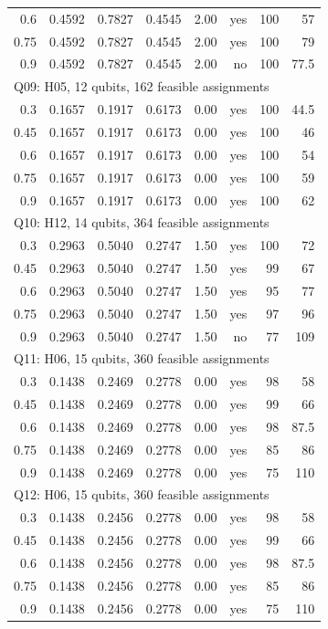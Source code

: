 \begin{longtable}{rrrrlrrr}
0.6 & 0.4592 & 0.7827 & 0.4545 & 2.00 & yes & 100 & 57 \\
0.75 & 0.4592 & 0.7827 & 0.4545 & 2.00 & yes & 100 & 79 \\
0.9 & 0.4592 & 0.7827 & 0.4545 & 2.00 & no & 100 & 77.5 \\
\multicolumn{8}{l}{Q09: H05, 12 qubits, 162 feasible assignments} \\
0.3 & 0.1657 & 0.1917 & 0.6173 & 0.00 & yes & 100 & 44.5 \\
0.45 & 0.1657 & 0.1917 & 0.6173 & 0.00 & yes & 100 & 46 \\
0.6 & 0.1657 & 0.1917 & 0.6173 & 0.00 & yes & 100 & 54 \\
0.75 & 0.1657 & 0.1917 & 0.6173 & 0.00 & yes & 100 & 59 \\
0.9 & 0.1657 & 0.1917 & 0.6173 & 0.00 & yes & 100 & 62 \\
\multicolumn{8}{l}{Q10: H12, 14 qubits, 364 feasible assignments} \\
0.3 & 0.2963 & 0.5040 & 0.2747 & 1.50 & yes & 100 & 72 \\
0.45 & 0.2963 & 0.5040 & 0.2747 & 1.50 & yes & 99 & 67 \\
0.6 & 0.2963 & 0.5040 & 0.2747 & 1.50 & yes & 95 & 77 \\
0.75 & 0.2963 & 0.5040 & 0.2747 & 1.50 & yes & 97 & 96 \\
0.9 & 0.2963 & 0.5040 & 0.2747 & 1.50 & no & 77 & 109 \\
\multicolumn{8}{l}{Q11: H06, 15 qubits, 360 feasible assignments} \\
0.3 & 0.1438 & 0.2469 & 0.2778 & 0.00 & yes & 98 & 58 \\
0.45 & 0.1438 & 0.2469 & 0.2778 & 0.00 & yes & 99 & 66 \\
0.6 & 0.1438 & 0.2469 & 0.2778 & 0.00 & yes & 98 & 87.5 \\
0.75 & 0.1438 & 0.2469 & 0.2778 & 0.00 & yes & 85 & 86 \\
0.9 & 0.1438 & 0.2469 & 0.2778 & 0.00 & yes & 75 & 110 \\
\multicolumn{8}{l}{Q12: H06, 15 qubits, 360 feasible assignments} \\
0.3 & 0.1438 & 0.2456 & 0.2778 & 0.00 & yes & 98 & 58 \\
0.45 & 0.1438 & 0.2456 & 0.2778 & 0.00 & yes & 99 & 66 \\
0.6 & 0.1438 & 0.2456 & 0.2778 & 0.00 & yes & 98 & 87.5 \\
0.75 & 0.1438 & 0.2456 & 0.2778 & 0.00 & yes & 85 & 86 \\
0.9 & 0.1438 & 0.2456 & 0.2778 & 0.00 & yes & 75 & 110 \\

\end{longtable}
